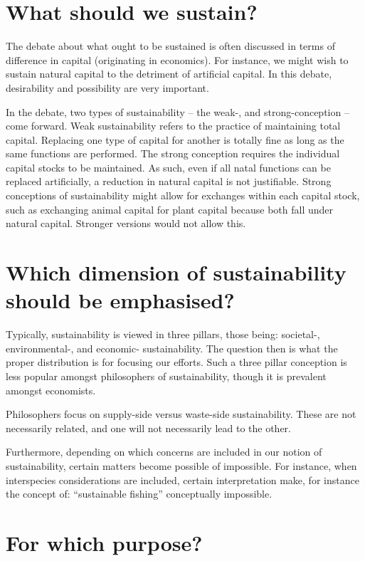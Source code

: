 \documentclass[12pt]{report}
\begin{document}
\section{What should we sustain?}

The debate about what ought to be sustained is often discussed in terms of
difference in capital (originating in economics). For instance, we might wish to
sustain natural capital to the detriment of artificial capital. In this debate,
desirability and possibility are very important.

In the debate, two types of sustainability -- the weak-, and strong-conception
-- come forward. Weak sustainability refers to the practice of maintaining total
capital. Replacing one type of capital for another is totally fine as long as
the same functions are performed. The strong conception requires the individual
capital stocks to be maintained. As such, even if all natal functions can be
replaced artificially, a reduction in natural capital is not justifiable. Strong
conceptions of sustainability might allow for exchanges within each capital
stock, such as exchanging animal capital for plant capital because both fall
under natural capital. Stronger versions would not allow this.

\section{Which dimension of sustainability should be emphasised?}

Typically, sustainability is viewed in three pillars, those being: societal-,
environmental-, and economic- sustainability. The question then is what the
proper distribution is for focusing our efforts. Such a three pillar conception
is less popular amongst philosophers of sustainability, though it is prevalent
amongst economists.

Philosophers focus on supply-side versus waste-side sustainability. These are
not necessarily related, and one will not necessarily lead to the other.

Furthermore, depending on which concerns are included in our notion of
sustainability, certain matters become possible of impossible. For instance,
when interspecies considerations are included, certain interpretation make, for
instance the concept of: ``sustainable fishing'' conceptually impossible.

\section{For which purpose?}
\end{document}
